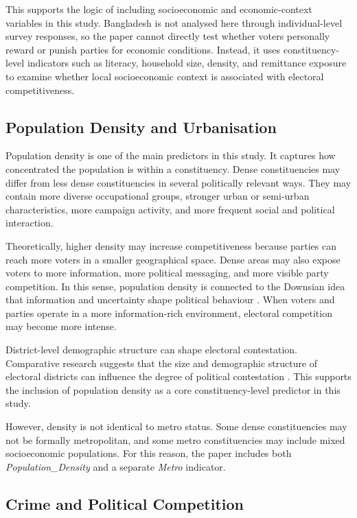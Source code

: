 \documentclass[12pt,a4paper]{article}
\begin{document}
This supports the logic of including socioeconomic and economic-context variables in this study. Bangladesh is not analysed here through individual-level survey responses, so the paper cannot directly test whether voters personally reward or punish parties for economic conditions. Instead, it uses constituency-level indicators such as literacy, household size, density, and remittance exposure to examine whether local socioeconomic context is associated with electoral competitiveness.

\subsection{Population Density and Urbanisation}

Population density is one of the main predictors in this study. It captures how concentrated the population is within a constituency. Dense constituencies may differ from less dense constituencies in several politically relevant ways. They may contain more diverse occupational groups, stronger urban or semi-urban characteristics, more campaign activity, and more frequent social and political interaction.

Theoretically, higher density may increase competitiveness because parties can reach more voters in a smaller geographical space. Dense areas may also expose voters to more information, more political messaging, and more visible party competition. In this sense, population density is connected to the Downsian idea that information and uncertainty shape political behaviour \citep{downs1957}. When voters and parties operate in a more information-rich environment, electoral competition may become more intense.

District-level demographic structure can shape electoral contestation. Comparative research suggests that the size and demographic structure of electoral districts can influence the degree of political contestation \citep{gerring2015}. This supports the inclusion of population density as a core constituency-level predictor in this study.

However, density is not identical to metro status. Some dense constituencies may not be formally metropolitan, and some metro constituencies may include mixed socioeconomic populations. For this reason, the paper includes both \textit{Population\_Density} and a separate \textit{Metro} indicator.

\subsection{Crime and Political Competition}
\end{document}
